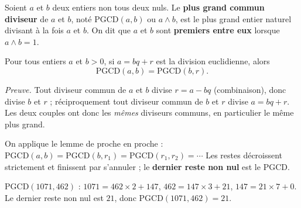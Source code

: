 \begin{definition}[PGCD]
Soient $a$ et $b$ deux entiers non tous deux nuls. Le \textbf{plus grand commun diviseur} de $a$ et $b$, noté $\mathrm{PGCD}(a,b)$ ou $a\wedge b$, est le plus grand entier naturel divisant à la fois $a$ et $b$. On dit que $a$ et $b$ sont \textbf{premiers entre eux} lorsque $a\wedge b=1$.
\end{definition}

\begin{theoreme}
Pour tous entiers $a$ et $b>0$, si $a=bq+r$ est la division euclidienne, alors
\[
\mathrm{PGCD}(a,b)=\mathrm{PGCD}(b,r).
\]
\end{theoreme}

\begin{remarque}
\emph{Preuve.} Tout diviseur commun de $a$ et $b$ divise $r=a-bq$ (combinaison), donc divise $b$ et $r$ ; réciproquement tout diviseur commun de $b$ et $r$ divise $a=bq+r$. Les deux couples ont donc les \emph{mêmes} diviseurs communs, en particulier le même plus grand.
\end{remarque}

\begin{theoreme}
On applique le lemme de proche en proche : $\mathrm{PGCD}(a,b)=\mathrm{PGCD}(b,r_1)=\mathrm{PGCD}(r_1,r_2)=\cdots$ Les restes décroissent strictement et finissent par s'annuler ; le \textbf{dernier reste non nul} est le PGCD.
\end{theoreme}

\begin{illus}
\end{illus}

\begin{exemple}
$\mathrm{PGCD}(1071,462)$ : $1071=462\times2+147$, $462=147\times3+21$, $147=21\times7+0$. Le dernier reste non nul est $21$, donc $\mathrm{PGCD}(1071,462)=21$.
\end{exemple}

